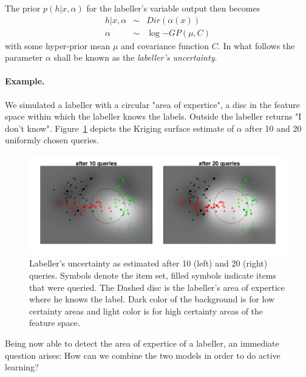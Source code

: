 \documentclass[10pt, onecolumn]{article}
\begin{document}
The prior $p(h|x,\alpha)$ for the labeller's variable output then
becomes 
\begin{eqnarray}
h | x, \alpha &\sim& Dir(\alpha(x))\\
\alpha &\sim & \log{-GP(\mu, C)}
\end{eqnarray}
with some hyper-prior mean $\mu$ and covariance function $C$. In what
follows the parameter $\alpha$ shall be known as the \emph{labeller's
  uncertainty}. 


\paragraph{Example.} We simulated a labeller with a circular "area of
expertice", a disc in the feature space within which the labeller
knows the labels. Outside the labeller returns "I don't
know". Figure~\ref{fig:est_alpha1} depicts the Kriging surface
estimate of $\alpha$ after 10 and 20 uniformly chosen queries. 

\begin{figure}[hbtp]
\centering
\includegraphics[width=6in]{figures/estimated_alpha.pdf}
\caption{Labeller's uncertainty as estimated after 10 (left) and 20
  (right) queries. Symbols denote the item set, filled symbols
  indicate items that were queried. The Dashed disc is the labeller's
  area of expertice where he knows the label. Dark color of the
  background is for low certainty areas and light color is for high
  certainty areas of the feature space.}
\label{fig:est_alpha1}
\end{figure}

Being now able to detect the area of expertice of a labeller, an
immediate question arises: How can we combine the two models in order
to do active learning? 

\end{document}
